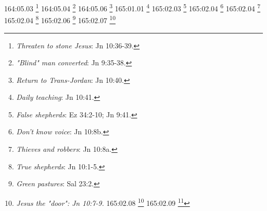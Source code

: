 {{{{{{{{{{{{{{{{{{{{{{{{{{{{{{{{{{{{{{{{{{164:05.03 \footnote{\textit{Threaten to stone Jesus}: Jn 10:36-39.}
164:05.04 \footnote{\textit{"Blind" man converted}: Jn 9:35-38.}
164:05.06 \footnote{\textit{Return to Trans-Jordan}: Jn 10:40.}
165:01.01 \footnote{\textit{Daily teaching}: Jn 10:41.}
165:02.03 \footnote{\textit{False shepherds}: Ez 34:2-10; Jn 9:41.}
165:02.04 \footnote{\textit{Don't know voice}: Jn 10:8b.}
165:02.04 \footnote{\textit{Thieves and robbers}: Jn 10:8a.}
165:02.04 \footnote{\textit{True shepherds}: Jn 10:1-5.}
165:02.06 \footnote{\textit{Green pastures}: Sal 23:2.}
165:02.07 \footnote{\textit{Jesus the "door": Jn 10:7-9.}
165:02.08 \footnote{\textit{Jesus the true shepherd}: Ez 34:11-16; Jn 10:10-15.}
165:02.09 \footnote{\textit{Other sheep have I: Jn 10:16; Jn 11:52.}
165:02.10 \footnote{\textit{Shepherd willing to die}: Jn 10:17-18.}
165:02.11 \footnote{\textit{Division about saying}: Jn 10:19-21.}
165:02.12 \footnote{\textit{Many believed}: Jn 10:42.}
165:03.01 \footnote{\textit{Gathering crowds}: Lc 12:1a.}
165:03.02 \footnote{\textit{Beware leaven of Pharisees}: Mt 16:6,11-12; Mc 8:15; Lc 12:1.}
165:03.02 \footnote{\textit{Leaven of Pharisees}: Lc 12:1b-2.}
165:03.02 \footnote{\textit{Soon nothing hidden}: Mt 10:26-27; Mc 4:22.}
165:03.03 \footnote{\textit{Fear not killers of body}: Mt 10:28; Lc 12:4-5; 1 P 3:14.}
165:03.03 \footnote{\textit{Proclaim from housetops}: Lc 12:3.}
165:03.03 \footnote{\textit{Whom to fear}: Jud 1:24.}
165:03.04 \footnote{\textit{Sparrows fall, hairs numbered}: Mt 10:29-31; Lc 12:6-7.}
165:03.05 \footnote{\textit{Confess me before men}: Mt 10:32-33; Lc 12:8-9.}
165:03.06 \footnote{\textit{Unforgivable sin}: Mt 12:31-32; Lc 12:10.}
165:03.07 \footnote{\textit{Spirit will give answers}: Mt 10:16-20; Mc 13:9-11; Lc 12:11-12; Lc 21:13-15.}
165:03.08 \footnote{\textit{Came to reveal Father}: Mt 5:45-48; Mt 6:1,4,6; Mt 11:25-27; Mc 11:25-26; Lc 6:35-36; Lc 10:22; Jn 1:18; Jn 3:31-34; Jn 4:21-24; Jn 6:45-46; Jn 14:6-11,20; Jn 15:15; Jn 16:25; Jn 17:8,25-26.}
165:03.08 \footnote{\textit{Spiritual inheritance}: Hch 20:32; Hch 26:18; Col 3:24; 1 P 1:3-4.}
165:03.08 \footnote{\textit{Whosoever will may come}: Sal 50:15; Jl 2:32; Zac 13:9; Mt 7:24; Mt 10:32-33; Mt 12:50; Mt 16:24-25; Mc 3:35; Mc 8:34-35; Lc 6:47; Lc 9:23-24; Lc 12:8; Jn 3:15-16; Jn 4:13-14; Jn 11:25-26; Jn 12:46; Hch 2:21; Hch 10:42-43; Hch 13:26; Ro 9:33; Ro 10:13; 1 Jn 2:23; 1 Jn 4:15; 1 Jn 5:1; Ap 22:17b.}
165:03.09 \footnote{\textit{Many believed}: Jn 10:42.}
165:04.01 \footnote{\textit{Love of material things}: Lc 12:13-15.}
165:04.02 \footnote{\textit{Parable of rich man}: Lc 12:16-19.}
}}}}}}}}}}}}}}}}}}}}}}}}}}}}}}}}}}}}}}}}}}}}
